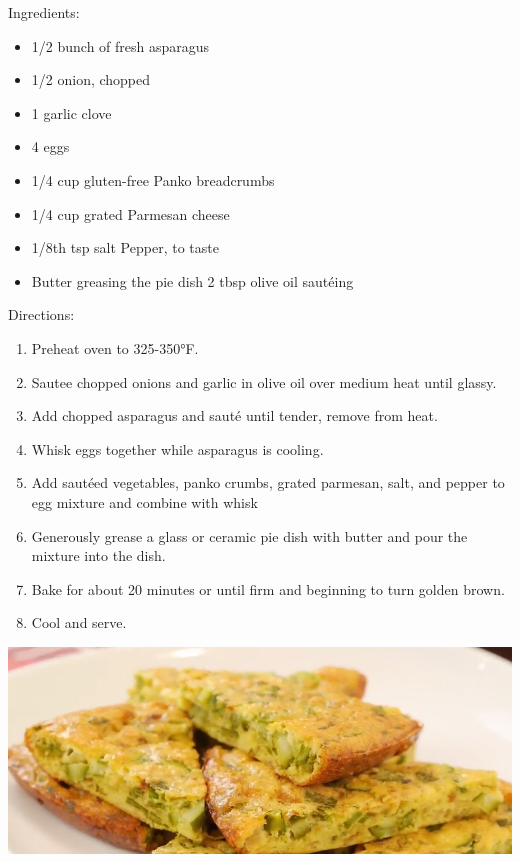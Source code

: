 \documentclass{article}
\begin{document}
%
%
%
%
%

\begin{multicols}{2}
Ingredients:
\begin{itemize}
\item 1/2 bunch of fresh asparagus
\item 1/2 onion, chopped
\item 1 garlic clove
\item 4 eggs
\item 1/4 cup gluten-free Panko breadcrumbs
\item 1/4 cup grated Parmesan cheese
\item 1/8th tsp salt Pepper, to taste
\item Butter greasing the pie dish 2 tbsp olive oil sautéing
\end{itemize}



\columnbreak

Directions:
\begin{enumerate}
\item Preheat oven to 325-350°F.

\item Sautee chopped onions and garlic in olive oil over medium heat until glassy.

\item Add chopped asparagus and sauté until tender, remove from heat.

\item Whisk eggs together while asparagus is cooling.

\item Add sautéed vegetables, panko crumbs, grated parmesan, salt, and pepper to egg mixture and combine with whisk

\item Generously grease a glass or ceramic pie dish with butter and pour the mixture into the dish.

\item Bake for about 20 minutes or until firm and beginning to turn golden brown.

\item Cool and serve.
\end{enumerate}
\end{multicols}



\begin{center}
\includegraphics[scale=0.4]{AsparagusTorta.png}
\end{center}
\end{document}
